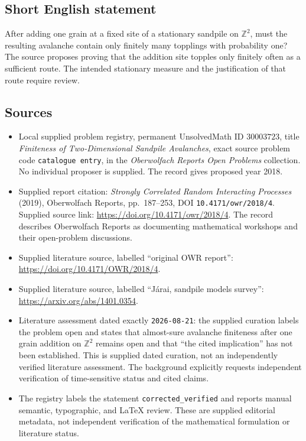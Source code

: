 \documentclass[11pt]{article}
\newcommand{\Z}{\mathbb{Z}}
\begin{document}
\subsection{Short English statement}
After adding one grain at a fixed site of a stationary sandpile on \(\Z^2\), must the resulting avalanche contain only finitely many topplings with probability one? The source proposes proving that the addition site topples only finitely often as a sufficient route. The intended stationary measure and the justification of that route require review.
\subsection{Sources}
\begin{itemize}
\item Local supplied problem registry, permanent UnsolvedMath ID \(30003723\), title \emph{Finiteness of Two-Dimensional Sandpile Avalanches}, exact source problem code \texttt{catalogue entry}, in the \emph{Oberwolfach Reports Open Problems} collection. No individual proposer is supplied. The record gives proposed year 2018.
\item Supplied report citation: \emph{Strongly Correlated Random Interacting Processes} (2019), Oberwolfach Reports, pp.\ 187--253, DOI \texttt{10.4171/owr/2018/4}. Supplied source link: \url{https://doi.org/10.4171/owr/2018/4}. The record describes Oberwolfach Reports as documenting mathematical workshops and their open-problem discussions.
\item Supplied literature source, labelled ``original OWR report'': \url{https://doi.org/10.4171/OWR/2018/4}.
\item Supplied literature source, labelled ``Járai, sandpile models survey'': \url{https://arxiv.org/abs/1401.0354}.
\item Literature assessment dated exactly \texttt{2026-08-21}: the supplied curation labels the problem open and states that almost-sure avalanche finiteness after one grain addition on \(\Z^2\) remains open and that ``the cited implication'' has not been established. This is supplied dated curation, not an independently verified literature assessment. The background explicitly requests independent verification of time-sensitive status and cited claims.
\item The registry labels the statement \texttt{corrected\_verified} and reports manual semantic, typographic, and LaTeX review. These are supplied editorial metadata, not independent verification of the mathematical formulation or literature status.
\end{itemize}
\end{document}
